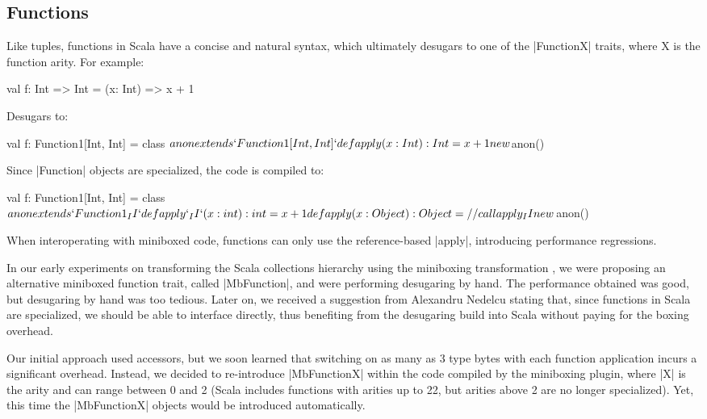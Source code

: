 \subsection{Functions}
\label{sec:functions}

Like tuples, functions in Scala have a concise and natural syntax, which ultimately desugars to one of the |FunctionX| traits, where X is the function arity. For example:

\begin{lstlisting-nobreak}
 val f: Int => Int = (x: Int) => x + 1
\end{lstlisting-nobreak}

Desugars to:

\begin{lstlisting-nobreak}
 val f: Function1[Int, Int] = {
   class $anon extends `Function1[Int, Int]` {
     def apply(x: Int): Int = x + 1
   }
   new $anon()
 }
\end{lstlisting-nobreak}

Since |Function| objects are specialized, the code is compiled to:

\begin{lstlisting-nobreak}
 val f: Function1[Int, Int] = {
   class $anon extends `Function1_II` {
     def apply`_II`(x: int): int = x + 1
     def apply(x: Object): Object = // call apply_II
   }
   new $anon()
 }
\end{lstlisting-nobreak}

When interoperating with miniboxed code, functions can only use the reference-based |apply|, introducing performance regressions.

In our early experiments on transforming the Scala collections hierarchy using the miniboxing transformation \cite{miniboxing-linkedlist}, we were proposing an alternative miniboxed function trait, called |MbFunction|, and were performing desugaring by hand. The performance obtained was good, but desugaring by hand was too tedious. Later on, we received a suggestion from Alexandru Nedelcu stating that, since functions in Scala are specialized, we should be able to interface directly, thus benefiting from the desugaring build into Scala without paying for the boxing overhead.

Our initial approach used accessors, but we soon learned that switching on as many as 3 type bytes with each function application incurs a significant overhead. Instead, we decided to re-introduce |MbFunctionX| within the code compiled by the miniboxing plugin, where |X| is the arity and can range between 0 and 2 (Scala includes functions with arities up to 22, but arities above 2 are no longer specialized). Yet, this time the |MbFunctionX| objects would be introduced automatically.

